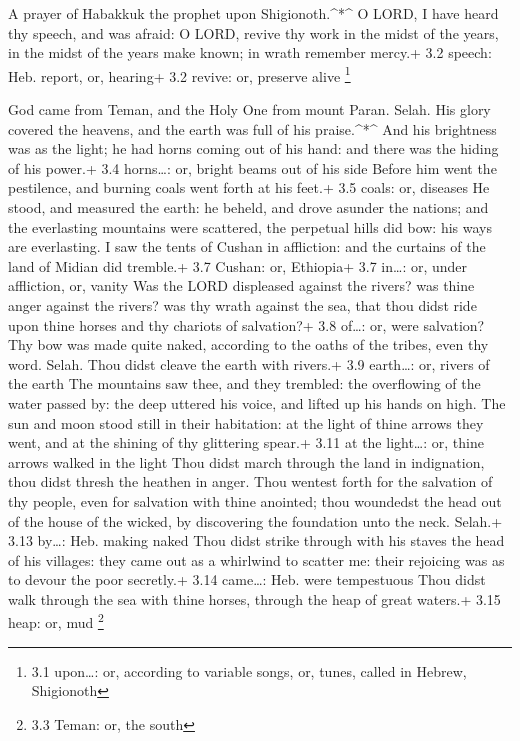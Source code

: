  A prayer of Habakkuk the prophet upon Shigionoth.\^{}*\^{}
 O LORD, I have heard thy speech, and was afraid: O LORD,
revive thy work in the midst of the years, in the midst of the years
make known; in wrath remember mercy.+ 3.2 speech: Heb. report, or,
hearing+ 3.2 revive: or, preserve alive \footnote{3.1 upon\ldots: or,
  according to variable songs, or, tunes, called in Hebrew, Shigionoth}

 God came from Teman, and the Holy One from mount Paran.
Selah. His glory covered the heavens, and the earth was full of his
praise.\^{}*\^{}  And his brightness was as the light; he
had horns coming out of his hand: and there was the hiding of his
power.+ 3.4 horns\ldots: or, bright beams out of his side 
Before him went the pestilence, and burning coals went forth at his
feet.+ 3.5 coals: or, diseases  He stood, and measured the
earth: he beheld, and drove asunder the nations; and the everlasting
mountains were scattered, the perpetual hills did bow: his ways are
everlasting.  I saw the tents of Cushan in affliction: and
the curtains of the land of Midian did tremble.+ 3.7 Cushan: or,
Ethiopia+ 3.7 in\ldots: or, under affliction, or, vanity 
Was the LORD displeased against the rivers? was thine anger against the
rivers? was thy wrath against the sea, that thou didst ride upon thine
horses and thy chariots of salvation?+ 3.8 of\ldots: or, were salvation?
 Thy bow was made quite naked, according to the oaths of the
tribes, even thy word. Selah. Thou didst cleave the earth with rivers.+
3.9 earth\ldots: or, rivers of the earth  The mountains saw
thee, and they trembled: the overflowing of the water passed by: the
deep uttered his voice, and lifted up his hands on high. 
The sun and moon stood still in their habitation: at the light of thine
arrows they went, and at the shining of thy glittering spear.+ 3.11 at
the light\ldots: or, thine arrows walked in the light  Thou
didst march through the land in indignation, thou didst thresh the
heathen in anger.  Thou wentest forth for the salvation of
thy people, even for salvation with thine anointed; thou woundedst the
head out of the house of the wicked, by discovering the foundation unto
the neck. Selah.+ 3.13 by\ldots: Heb. making naked  Thou
didst strike through with his staves the head of his villages: they came
out as a whirlwind to scatter me: their rejoicing was as to devour the
poor secretly.+ 3.14 came\ldots: Heb. were tempestuous 
Thou didst walk through the sea with thine horses, through the heap of
great waters.+ 3.15 heap: or, mud \footnote{3.3 Teman: or, the south}


